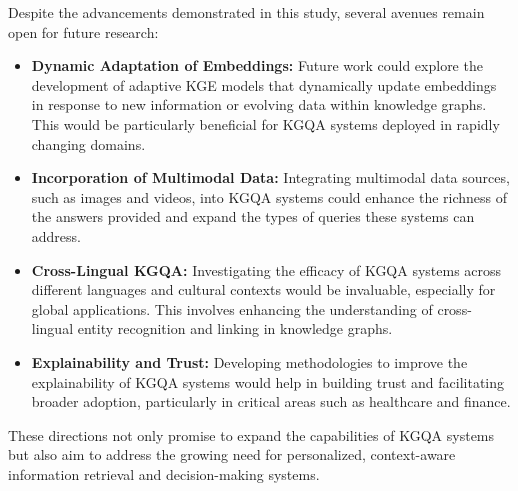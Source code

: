 \documentclass{article}
\begin{document}
Despite the advancements demonstrated in this study, several avenues remain open for future research:
\begin{itemize}
  \item \textbf{Dynamic Adaptation of Embeddings:} Future work could explore the development of adaptive KGE models that dynamically update embeddings in response to new information or evolving data within knowledge graphs. This would be particularly beneficial for KGQA systems deployed in rapidly changing domains.
  \item \textbf{Incorporation of Multimodal Data:} Integrating multimodal data sources, such as images and videos, into KGQA systems could enhance the richness of the answers provided and expand the types of queries these systems can address.
  \item \textbf{Cross-Lingual KGQA:} Investigating the efficacy of KGQA systems across different languages and cultural contexts would be invaluable, especially for global applications. This involves enhancing the understanding of cross-lingual entity recognition and linking in knowledge graphs.
  \item \textbf{Explainability and Trust:} Developing methodologies to improve the explainability of KGQA systems would help in building trust and facilitating broader adoption, particularly in critical areas such as healthcare and finance.
\end{itemize}

These directions not only promise to expand the capabilities of KGQA systems but also aim to address the growing need for personalized, context-aware information retrieval and decision-making systems.

\printbibliography[heading=bibnumbered]
\end{document}
